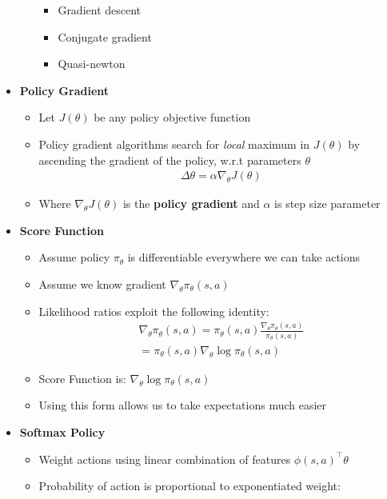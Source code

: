 \documentclass[12pt]{article}
\begin{document}
\begin{itemize}
\begin{itemize}
    \begin{itemize}
      \item Gradient descent
      \item Conjugate gradient
      \item Quasi-newton
    \end{itemize}
  \end{itemize}
  \item \textbf{Policy Gradient}
  \begin{itemize}
    \item Let $J(\theta)$ be any policy objective function
    \item Policy gradient algorithms search for \textit{local} maximum
    in $J(\theta)$ by ascending the gradient of the policy, w.r.t parameters
    $\theta$
    \begin{gather*}
      \Delta \theta = \alpha \nabla_\theta J(\theta) 
    \end{gather*}
    \item Where $\nabla_\theta J(\theta)$ is the \textbf{policy gradient} and
    $\alpha$ is step size parameter
  \end{itemize}
  \item \textbf{Score Function}
  \begin{itemize}
    \item Assume policy $\pi_\theta$ is differentiable everywhere we can take actions
    \item Assume we know gradient $\nabla_\theta \pi_\theta(s, a)$
    \item Likelihood ratios exploit the following identity:
    \begin{gather*}
      \nabla_\theta \pi_\theta (s, a) = \pi_\theta(s, a) \frac{\nabla_\theta \pi_\theta(s, a)}{\pi_\theta(s, a)} \\
      = \pi_\theta (s, a) \nabla_\theta \log \pi_\theta (s, a)
    \end{gather*}
    \item Score Function is: $\nabla_\theta \log \pi_\theta (s, a)$
    \item Using this form allows us to take expectations much easier
  \end{itemize}
  \item \textbf{Softmax Policy}
  \begin{itemize}
    \item Weight actions using linear combination of features $\phi(s, a)^\top\theta$
    \item Probability of action is proportional to exponentiated weight:

\end{itemize}
\end{itemize}
\end{document}
